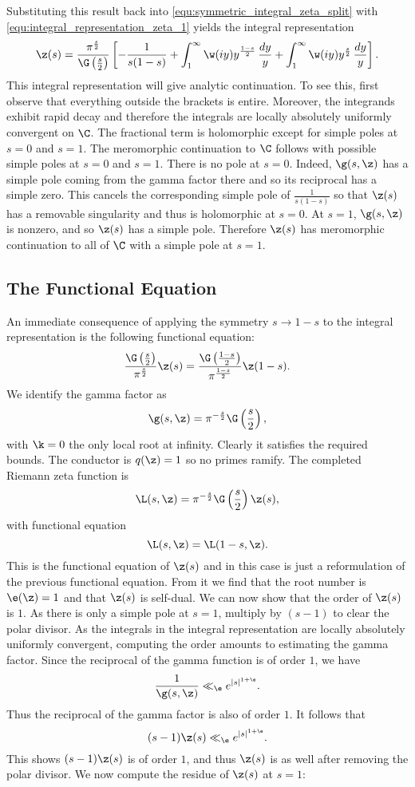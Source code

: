       Substituting this result back into \cref{equ:symmetric_integral_zeta_split} with \cref{equ:integral_representation_zeta_1} yields the integral representation
      \[
        \z(s) = \frac{\pi^{\frac{s}{2}}}{\G\left(\frac{s}{2}\right)}\left[-\frac{1}{s(1-s)}+\int_{1}^{\infty}\w(iy)y^{\frac{1-s}{2}}\,\frac{dy}{y}+\int_{1}^{\infty}\w(iy)y^{\frac{s}{2}}\,\frac{dy}{y}\right].
      \]
      This integral representation will give analytic continuation. To see this, first observe that everything outside the brackets is entire. Moreover, the integrands exhibit rapid decay and therefore the integrals are locally absolutely uniformly convergent on $\C$. The fractional term is holomorphic except for simple poles at $s = 0$ and $s = 1$. The meromorphic continuation to $\C$ follows with possible simple poles at $s = 0$ and $s = 1$. There is no pole at $s = 0$. Indeed, $\g(s,\z)$ has a simple pole coming from the gamma factor there and so its reciprocal has a simple zero. This cancels the corresponding simple pole of $\frac{1}{s(1-s)}$ so that $\z(s)$ has a removable singularity and thus is holomorphic at $s = 0$. At $s = 1$, $\g(s,\z)$ is nonzero, and so $\z(s)$ has a simple pole. Therefore $\z(s)$ has meromorphic continuation to all of $\C$ with a simple pole at $s = 1$. 
    \subsection*{The Functional Equation}
      An immediate consequence of applying the symmetry $s \to 1-s$ to the integral representation is the following functional equation:
      \[
        \frac{\G\left(\frac{s}{2}\right)}{\pi^{\frac{s}{2}}}\z(s) = \frac{\G\left(\frac{1-s}{2}\right)}{\pi^{\frac{1-s}{2}}}\z(1-s).
      \]
      We identify the gamma factor as
      \[
        \g(s,\z) = \pi^{-\frac{s}{2}}\G\left(\frac{s}{2}\right),
      \]
      with $\k = 0$ the only local root at infinity. Clearly it satisfies the required bounds. The conductor is $q(\z) = 1$ so no primes ramify. The completed Riemann zeta function is
      \[
        \L(s,\z) = \pi^{-\frac{s}{2}}\G\left(\frac{s}{2}\right)\z(s),
      \]
      with functional equation
      \[
        \L(s,\z) = \L(1-s,\z).
      \]
      This is the functional equation of $\z(s)$ and in this case is just a reformulation of the previous functional equation. From it we find that the root number is $\e(\z) = 1$ and that $\z(s)$ is self-dual. We can now show that the order of $\z(s)$ is $1$. As there is only a simple pole at $s = 1$, multiply by $(s-1)$ to clear the polar divisor. As the integrals in the integral representation are locally absolutely uniformly convergent, computing the order amounts to estimating the gamma factor. Since the reciprocal of the gamma function is of order $1$, we have
      \[
        \frac{1}{\g(s,\z)} \ll_{\e} e^{|s|^{1+\e}}.
      \]
      Thus the reciprocal of the gamma factor is also of order $1$. It follows that
      \[
        (s-1)\z(s) \ll_{\e} e^{|s|^{1+\e}}.
      \]
      This shows $(s-1)\z(s)$ is of order $1$, and thus $\z(s)$ is as well after removing the polar divisor. We now compute the residue of $\z(s)$ at $s = 1$:

